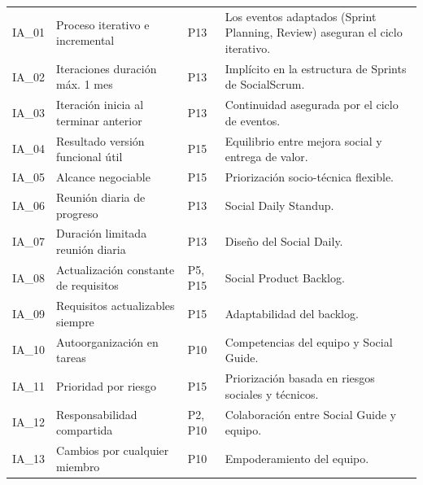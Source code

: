 \begin{longtable}[H]{
    >{\raggedright\arraybackslash}p{1.2cm}
    >{\raggedright\arraybackslash}p{6.5cm}
    >{\centering\arraybackslash}p{1.5cm}
    >{\raggedright\arraybackslash}p{3.8cm}
    }
    IA\_01       & Proceso iterativo e incremental          & P13               & Los eventos adaptados (Sprint Planning, Review) aseguran el ciclo iterativo. \\
    IA\_02       & Iteraciones duración máx. 1 mes          & P13               & Implícito en la estructura de Sprints de SocialScrum.                        \\
    IA\_03       & Iteración inicia al terminar anterior    & P13               & Continuidad asegurada por el ciclo de eventos.                               \\
    IA\_04       & Resultado versión funcional útil         & P15               & Equilibrio entre mejora social y entrega de valor.                           \\
    IA\_05       & Alcance negociable                       & P15               & Priorización socio-técnica flexible.                                         \\
    IA\_06       & Reunión diaria de progreso               & P13               & Social Daily Standup.                                                        \\
    IA\_07       & Duración limitada reunión diaria         & P13               & Diseño del Social Daily.                                                     \\
    IA\_08       & Actualización constante de requisitos    & P5, P15           & Social Product Backlog.                                                      \\
    IA\_09       & Requisitos actualizables siempre         & P15               & Adaptabilidad del backlog.                                                   \\
    IA\_10       & Autoorganización en tareas               & P10               & Competencias del equipo y Social Guide.                                      \\
    IA\_11       & Prioridad por riesgo                     & P15               & Priorización basada en riesgos sociales y técnicos.                          \\
    IA\_12       & Responsabilidad compartida               & P2, P10           & Colaboración entre Social Guide y equipo.                                    \\
    IA\_13       & Cambios por cualquier miembro            & P10               & Empoderamiento del equipo.                                                   \\

\end{longtable}
